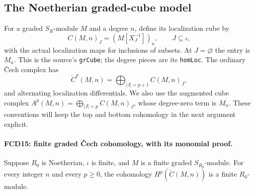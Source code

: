 \subsection{The Noetherian graded-cube model}

For a graded $S_R$-module $M$ and a degree $n$, define its
localization cube by
\[
 C(M,n)_J=(M[X_J^{-1}])_n,\qquad J\subseteq\iota,    \tag{FCD.15}\label{FCD.15}
\]
with the actual localization maps for inclusions of subsets.  At
$J=\varnothing$ the entry is $M_n$.  This is the source's
\texttt{grCube}; the degree pieces are its \texttt{homLoc}.
The ordinary \v Cech complex has
\[
 \check C^p(M,n)=\bigoplus_{|J|=p+1}C(M,n)_J,
\]
and alternating localization differentials.  We also use the
augmented cube complex $A^p(M,n)=\bigoplus_{|J|=p}C(M,n)_J$,
whose degree-zero term is $M_n$.  These conventions will keep the
top and bottom cohomology in the next argument explicit.

\paragraph{FCD15: finite graded \v Cech cohomology, with its monomial proof.}
\label{claim:FCD15}
Suppose $R_0$ is Noetherian, $\iota$ is finite, and $M$ is a
finite graded $S_{R_0}$-module.  For every integer $n$ and
every $p\ge0$, the cohomology $H^p(\check C(M,n))$ is a finite
$R_0$-module.

